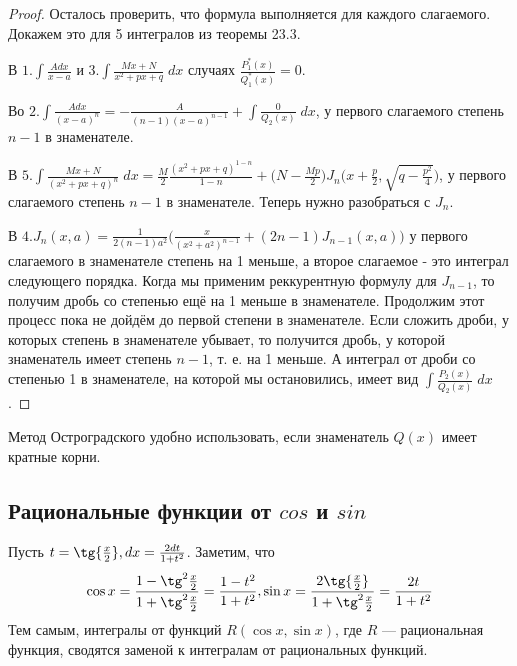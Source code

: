 \begin{proof}
		Осталось проверить, что формула выполняется для каждого слагаемого. Докажем это для 5 интегралов из теоремы 23.3.
		
		В $1. \displaystyle\int \frac{Adx}{x - a}$ и $3. \displaystyle\int \frac{Mx + N}{x^2 + px + q} \; dx$ случаях $\frac{P^*_1(x)}{Q^*_1(x)} = 0.$
		
		Во $2. \displaystyle\int \frac{Adx}{(x - a)^n} = -\frac{A}{(n - 1)(x - a)^{n - 1}} + \displaystyle\int \frac{0}{Q_2(x)} \; dx$, у первого слагаемого степень $n - 1$ в знаменателе.
		
		В $5. \displaystyle\int \frac{Mx + N}{(x^2 + px + q)^n} \; dx = \frac{M}{2} \frac{(x^2 + px + q)^{1 - n}}{1 - n} + \bigg(N - \frac{Mp}{2}\bigg) J_n \bigg(x + \frac{p}{2}, \sqrt{q - \frac{p^2}{4}}\bigg)$, у первого слагаемого степень $n - 1$ в знаменателе. Теперь нужно разобраться с $J_n$.
		
		В $4.\displaystyle J_{n}(x, a) = \frac{1}{2(n - 1)a^2} \bigg(\frac{x}{(x^2 + a^2)^{n - 1}} + (2n - 1)J_{n - 1}(x, a)\bigg)$ у первого слагаемого в знаменателе степень на 1 меньше, а второе слагаемое - это интеграл следующего порядка. Когда мы применим реккурентную формулу для $J_{n - 1}$, то получим дробь со степенью ещё на 1 меньше в знаменателе. Продолжим этот процесс пока не дойдём до первой степени в знаменателе. Если сложить дроби, у которых степень в знаменателе убывает, то получится дробь, у которой знаменатель имеет степень $n - 1$, т. е. на 1 меньше. А интеграл от дроби со степенью 1 в знаменателе, на которой мы остановились, имеет вид $\displaystyle\int \frac{P_2(x)}{Q_2(x)} \; dx$.
	\end{proof}
	
	\begin{mention}
		Метод Остроградского удобно использовать, если знаменатель $Q(x)$ имеет кратные корни.
	\end{mention}
	
	\subsection{Рациональные функции от $cos$ и $sin$}
	
	\begin{example}
		Пусть $t = \tg{\frac{x}{2}}, dx = \frac{2dt}{1 + t^2}$. Заметим, что
		\[ \cos{x} = \frac{1 - \tg^2{\frac{x}{2}}}{1 + \tg^2{\frac{x}{2}}} = \frac{1 - t^2}{1 + t^2}, \sin{x} = \frac{2\tg{\frac{x}{2}}}{1 + \tg^2{\frac{x}{2}}} = \frac{2t}{1 + t^2} \]
		Тем самым, интегралы от функций $R(\cos{x},\sin{x})$, где $R$ —
		рациональная функция, сводятся заменой к интегралам от
		рациональных функций.
	\end{example}
	
